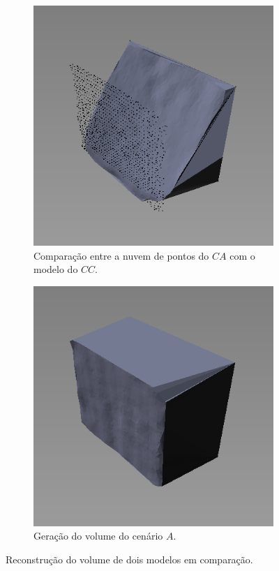 \begin{figure}[H]
\begin{subfigure}[t]{0.325\textwidth}
        \includegraphics[width=\textwidth]{dados/figuras/projection2.png}
        \caption{Comparação entre a nuvem de pontos do $CA$ com o modelo do $CC$.}
        \label{fig:projection2}
    \end{subfigure}
    \begin{subfigure}[t]{0.325\textwidth}
        \includegraphics[width=\textwidth]{dados/figuras/projection3.png}
        \caption{Geração do volume do cenário $A$.}
        \label{fig:projection3}
    \end{subfigure}
    \caption{Reconstrução do volume de dois modelos em comparação.}
    \label{fig:projection}
\end{figure}

